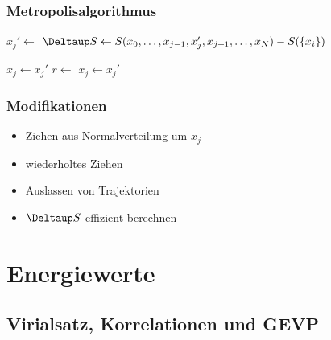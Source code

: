 \documentclass[ngerman, fleqn]{beamer}
\newcommand\timesites{N}
\begin{document}
\begin{frame}
    \frametitle{Metropolisalgorithmus}
    
    \begin{algorithmic}
        \For{$j \gets 1, \ldots, \timesites$}
            \State $x_j' \gets$ 
            \State $\Deltaup S \gets S(x_0, \ldots, x_{j-1}, x_j',
            x_{j+1}, \ldots, x_\timesites) - S(\{x_i\})$

                \State $x_j \gets x_j'$
            \Else
                \State $r \gets$ 
                    \State $x_j \gets x_j'$
                \EndIf
            \EndIf
        \EndFor
    \end{algorithmic}
\end{frame}

\begin{frame}
    \frametitle{Modifikationen}

    \begin{itemize}
        \item
            Ziehen aus Normalverteilung um $x_j$

        \item
            wiederholtes Ziehen

        \item
            Auslassen von Trajektorien

        \item
            $\Deltaup S$ effizient berechnen
    \end{itemize}
\end{frame}

\section{Energiewerte}

\frame\sectionpage

\subsection{Virialsatz, Korrelationen und GEVP}

\frame\subsectionpage
\end{document}
